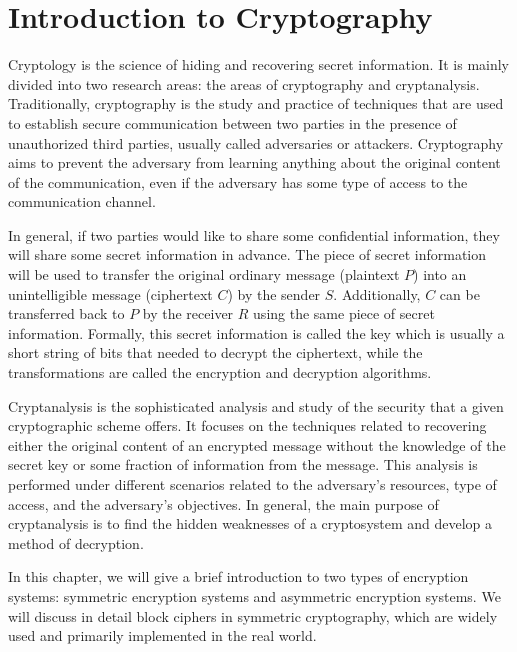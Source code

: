 
\chapter{Introduction to Cryptography} \label{ch:ItC}
Cryptology is the science of hiding and recovering secret information. It is mainly divided into two research areas: the areas of cryptography and cryptanalysis. Traditionally, cryptography is the study and practice of techniques that are used to establish secure communication between two parties in the presence of unauthorized third parties, usually called adversaries or attackers. Cryptography aims to prevent the adversary from learning anything about the original content of the communication, even if the adversary has some type of access to the communication channel. 

In general, if two parties would like to share some confidential information, they will share some secret information in advance. The piece of secret information will be used to transfer the original ordinary message (plaintext $P$) into an unintelligible message (ciphertext $C$) by the sender $S$. Additionally, $C$ can be transferred back to $P$ by the receiver $R$ using the same piece of secret information.  Formally, this secret information is called the key which is usually a short string of bits that needed to decrypt the ciphertext, while the transformations are called the encryption and decryption algorithms. 

Cryptanalysis is the sophisticated analysis and study of the security that a given cryptographic scheme offers. It focuses on the techniques related to recovering either the original content of an encrypted message without the knowledge of the secret key or some fraction of information from the message. This analysis is performed under different scenarios related to the adversary's resources, type of access, and the adversary's objectives. In general, the main purpose of cryptanalysis is to find the hidden weaknesses of a cryptosystem and develop a method of decryption.

In this chapter, we will give a brief introduction to two types of encryption systems: symmetric encryption systems and asymmetric encryption systems. We will discuss in detail block ciphers in symmetric cryptography, which are widely used and primarily implemented in the real world. 

